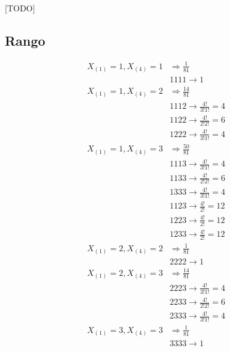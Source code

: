 \documentclass{article}
\begin{document}
    \paragraph{}
    [TODO]

    \subsection{Rango}


    \begin{align*}
      X_{(1)} = 1,X_{(4)} = 1 & \Rightarrow \frac{1}{81}\\
      &1111 \rightarrow 1 \\
      X_{(1)} = 1,X_{(4)} = 2 & \Rightarrow \frac{14}{81}\\
      &1112 \rightarrow \frac{4!}{3!1!} = 4 \\
      &1122 \rightarrow \frac{4!}{2!2!} = 6  \\
      &1222 \rightarrow \frac{4!}{3!1!} = 4  \\
      X_{(1)} = 1,X_{(4)} = 3 & \Rightarrow \frac{50}{81}\\
      &1113 \rightarrow \frac{4!}{3!1!} = 4 \\
      &1133 \rightarrow \frac{4!}{2!2!} = 6  \\
      &1333 \rightarrow \frac{4!}{3!1!} = 4  \\
      &1123 \rightarrow \frac{4!}{2!} = 12 \\
      &1223 \rightarrow \frac{4!}{2!} = 12  \\
      &1233 \rightarrow \frac{4!}{2!} = 12  \\
      X_{(1)} = 2,X_{(4)} = 2 & \Rightarrow \frac{1}{81}\\
      &2222 \rightarrow 1 \\
      X_{(1)} = 2,X_{(4)} = 3 & \Rightarrow \frac{14}{81}\\
      &2223 \rightarrow \frac{4!}{3!1!} = 4 \\
      &2233 \rightarrow \frac{4!}{2!2!} = 6  \\
      &2333 \rightarrow \frac{4!}{3!1!} = 4  \\
      X_{(1)} = 3,X_{(4)} = 3 & \Rightarrow \frac{1}{81}\\
      &3333 \rightarrow 1 \\
    \end{align*}
\end{document}
